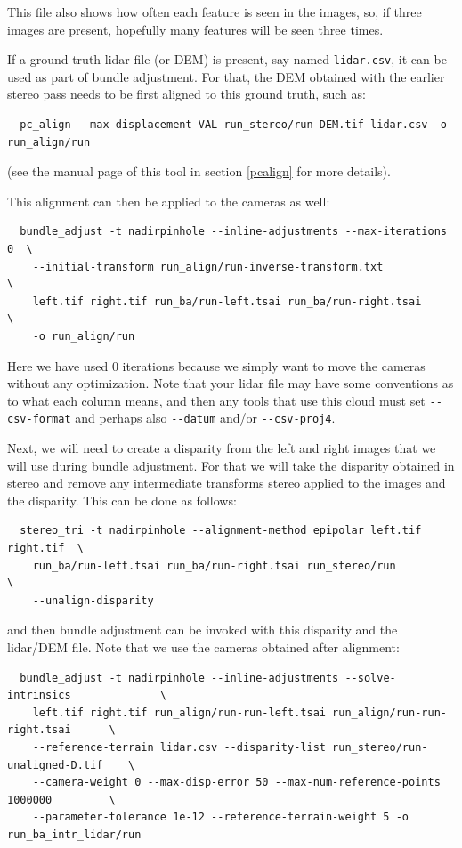 This file also shows how often each feature is seen in the images, so, if three
images are present, hopefully many features will be seen three times. 

If a ground truth lidar file (or DEM) is present, say named \texttt{lidar.csv}, it can be used
as part of bundle adjustment. For that, the DEM obtained with the earlier
stereo pass needs to be first aligned to this ground truth, such as:

\begin{verbatim}
  pc_align --max-displacement VAL run_stereo/run-DEM.tif lidar.csv -o run_align/run 
\end{verbatim}

(see the manual page of this tool in section \ref{pcalign} for more details). 

This alignment can then be applied to the cameras as well:

\begin{verbatim}
  bundle_adjust -t nadirpinhole --inline-adjustments --max-iterations 0  \
    --initial-transform run_align/run-inverse-transform.txt              \
    left.tif right.tif run_ba/run-left.tsai run_ba/run-right.tsai        \
    -o run_align/run
\end{verbatim}

Here we have used 0 iterations because we simply want to move the cameras
without any optimization. Note that your lidar file may have some conventions as to what each column
means, and then any tools that use this cloud must set \texttt{-\/-csv-format}
and perhaps also \texttt{-\/-datum} and/or \texttt{-\/-csv-proj4}. 

Next, we will need to create a disparity from the left and right images
that we will use during bundle adjustment. For that we will take the disparity obtained
in stereo and remove any intermediate transforms stereo applied to the
images and the disparity. This can be done as follows:

\begin{verbatim}
  stereo_tri -t nadirpinhole --alignment-method epipolar left.tif right.tif  \
    run_ba/run-left.tsai run_ba/run-right.tsai run_stereo/run                \
    --unalign-disparity 
\end{verbatim}

and then bundle adjustment can be invoked with this disparity and
the lidar/DEM file. Note that we use the cameras obtained after alignment:

\begin{verbatim}
  bundle_adjust -t nadirpinhole --inline-adjustments --solve-intrinsics              \
    left.tif right.tif run_align/run-run-left.tsai run_align/run-run-right.tsai      \
    --reference-terrain lidar.csv --disparity-list run_stereo/run-unaligned-D.tif    \
    --camera-weight 0 --max-disp-error 50 --max-num-reference-points 1000000         \
    --parameter-tolerance 1e-12 --reference-terrain-weight 5 -o run_ba_intr_lidar/run
\end{verbatim}

